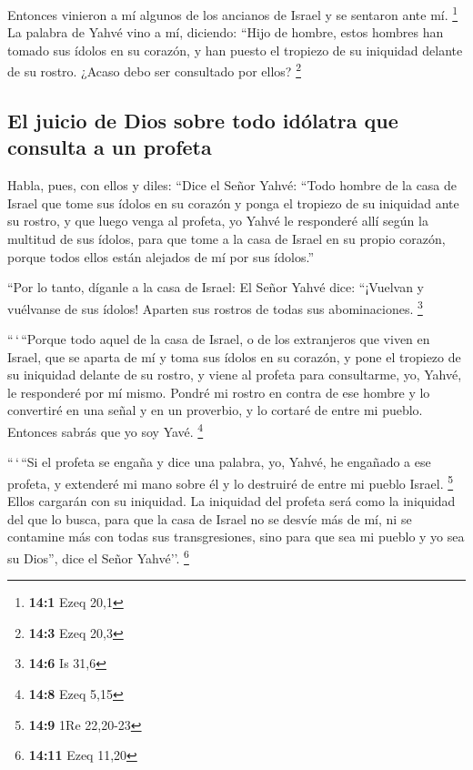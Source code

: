  Entonces vinieron a mí algunos de los ancianos de Israel
y se sentaron ante mí. \footnote{\textbf{14:1} Ezeq 20,1} 
La palabra de Yahvé vino a mí, diciendo:  ``Hijo de
hombre, estos hombres han tomado sus ídolos en su corazón, y han puesto
el tropiezo de su iniquidad delante de su rostro. ¿Acaso debo ser
consultado por ellos? \footnote{\textbf{14:3} Ezeq 20,3}

\hypertarget{el-juicio-de-dios-sobre-todo-iduxf3latra-que-consulta-a-un-profeta}{%
\subsection{El juicio de Dios sobre todo idólatra que consulta a un
profeta}\label{el-juicio-de-dios-sobre-todo-iduxf3latra-que-consulta-a-un-profeta}}

 Habla, pues, con ellos y diles: ``Dice el Señor Yahvé:
``Todo hombre de la casa de Israel que tome sus ídolos en su corazón y
ponga el tropiezo de su iniquidad ante su rostro, y que luego venga al
profeta, yo Yahvé le responderé allí según la multitud de sus ídolos,
 para que tome a la casa de Israel en su propio corazón,
porque todos ellos están alejados de mí por sus ídolos.''

 ``Por lo tanto, díganle a la casa de Israel: El Señor
Yahvé dice: ``¡Vuelvan y vuélvanse de sus ídolos! Aparten sus rostros de
todas sus abominaciones. \footnote{\textbf{14:6} Is 31,6}

 ``\,`\,``Porque todo aquel de la casa de Israel, o de los
extranjeros que viven en Israel, que se aparta de mí y toma sus ídolos
en su corazón, y pone el tropiezo de su iniquidad delante de su rostro,
y viene al profeta para consultarme, yo, Yahvé, le responderé por mí
mismo.  Pondré mi rostro en contra de ese hombre y lo
convertiré en una señal y en un proverbio, y lo cortaré de entre mi
pueblo. Entonces sabrás que yo soy Yavé. \footnote{\textbf{14:8} Ezeq
  5,15}

 ``\,`\,``Si el profeta se engaña y dice una palabra, yo,
Yahvé, he engañado a ese profeta, y extenderé mi mano sobre él y lo
destruiré de entre mi pueblo Israel. \footnote{\textbf{14:9} 1Re
  22,20-23}  Ellos cargarán con su iniquidad. La
iniquidad del profeta será como la iniquidad del que lo busca,
 para que la casa de Israel no se desvíe más de mí, ni se
contamine más con todas sus transgresiones, sino para que sea mi pueblo
y yo sea su Dios'', dice el Señor Yahvé''. \footnote{\textbf{14:11} Ezeq
  11,20}

